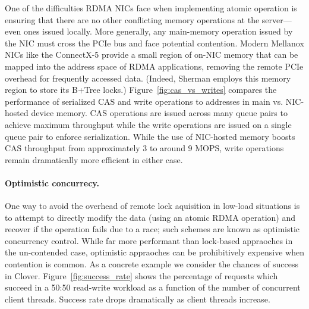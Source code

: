 One of the difficulties RDMA NICs face when implementing atomic operation
is ensuring that there are no other conflicting memory operations at
the server---even ones issued locally.  More generally, any
main-memory operation issued by the NIC must cross the PCIe bus and
face potential contention.  Modern Mellanox NICs like the ConnectX-5
provide a small region of on-NIC memory that can be mapped into the
address space of RDMA applications,
removing the remote PCIe overhead for frequently accessed data.
(Indeed, Sherman employs this memory region to store its B+Tree locks.)
Figure~\ref{fig:cas_vs_writes} compares the performance of
serialized CAS and write operations to addresses in main vs.
NIC-hosted device memory. CAS operations are issued across many
queue pairs to achieve maximum throughput while the write operations are
issued on a single queue pair to enforce serialization.
While the use of NIC-hosted memory boosts CAS throughput
from approximately 3 to around 9 MOPS, write operations remain
dramatically more efficient in either case.

\paragraph{Optimistic concurrecy.}
One way to avoid the overhead of remote lock aquisition in low-load
situations is to attempt to directly modify the data (using an
atomic RDMA operation) and recover if the operation fails due to a
race; such schemes are known as optimistic concurrency control.  While
far more performant than lock-based appraoches in the un-contended
case, optimistic appraoches can be prohibitively expensive when
contention is common.  As a concrete example we consider the chances
of success in Clover.
Figure~\ref{fig:success_rate} shows the percentage of requests
which succeed in a 50:50 read-write workload as a function of the number of
concurrent client threads. Success rate drops dramatically as client threads
increase.

